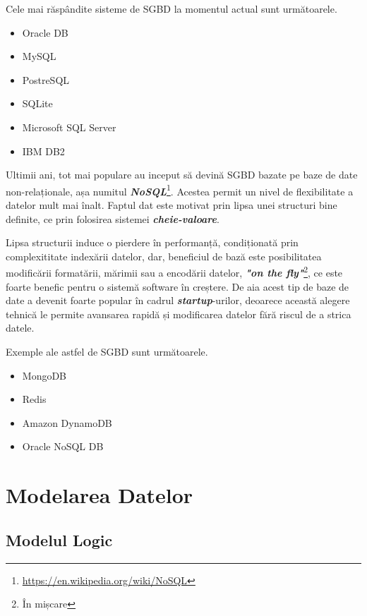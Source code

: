 \documentclass[12pt. a4paper]{report}
\begin{document}
Cele mai răspândite sisteme de SGBD la momentul actual sunt următoarele.
\begin{itemize}
	\item Oracle DB
	\item MySQL
	\item PostreSQL
	\item SQLite
	\item Microsoft SQL Server
	\item IBM DB2
\end{itemize}

Ultimii ani, tot mai populare au inceput să devină SGBD bazate pe baze de date non-relaționale, așa numitul \emph{\textbf{NoSQL}}\footnote{\url{https://en.wikipedia.org/wiki/NoSQL}}. Acestea permit un nivel de flexibilitate a datelor mult mai înalt. Faptul dat este motivat prin lipsa unei structuri bine definite, ce prin folosirea sistemei \emph{\textbf{cheie-valoare}}.

Lipsa structurii induce o pierdere în performanță, condiționată prin complexititate indexării datelor, dar, beneficiul de bază este posibilitatea modificării formatării, mărimii sau a encodării datelor, \emph{\textbf{"on the fly"}}\footnote{În mișcare}, ce este foarte benefic pentru o sistemă software în creștere. De aia acest tip de baze de date a devenit foarte popular în cadrul \emph{\textbf{startup}}-urilor, deoarece această alegere tehnică le permite avansarea rapidă și modificarea datelor fără riscul de a strica datele.

Exemple ale astfel de SGBD sunt următoarele.
\begin{itemize}
	\item MongoDB
	\item Redis
	\item Amazon DynamoDB
	\item Oracle NoSQL DB
\end{itemize}

\chapter{Modelarea Datelor}

\section{Modelul Logic}
\end{document}
